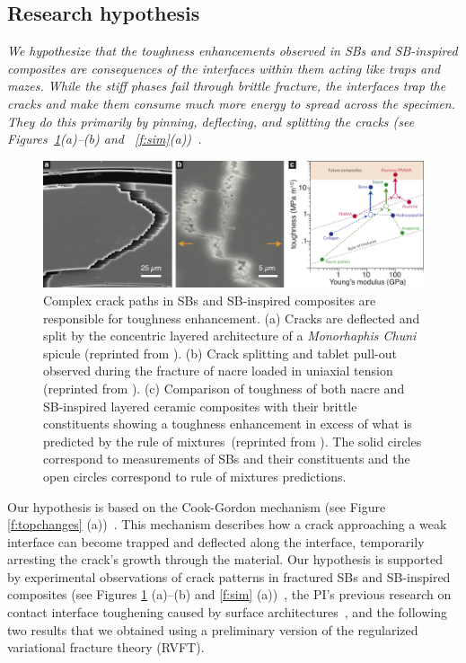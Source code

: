 \documentclass[10pt,letterpaper]{article}
\begin{document}
  \subsection{Research hypothesis}
    \label{s:hyp}
    \emph{We hypothesize that the toughness enhancements observed in SBs and SB-inspired composites are consequences of the interfaces within them acting like traps and mazes. While the stiff phases fail through brittle fracture, the interfaces trap the cracks and make them consume much more energy to spread across the specimen. They do this primarily by pinning, deflecting, and splitting the cracks (see Figures~\ref{f:hyp}(a)--(b) and ~\ref{f:sim}(a))~\cite{gao1989first,dalmas2009crack,gu1997crack}.}
%
    \begin{figure}[h!]
         \centering
           \includegraphics[width=\textwidth, trim={0 0.0cm 0.0cm 0}, clip]{Figures/Introduction/CrackPath_V2.pdf}
           \caption{ \footnotesize Complex crack paths in SBs and SB-inspired composites are responsible for toughness enhancement. (a) Cracks are deflected and split by the concentric layered architecture of a \textit{Monorhaphis Chuni} spicule (reprinted from \cite{Weaver:2010ew}). (b) Crack splitting and tablet pull-out observed during the fracture of nacre loaded in uniaxial tension (reprinted from \cite{wegst2015bioinspired}). (c) Comparison of toughness of both nacre and SB-inspired layered ceramic composites with their brittle constituents showing a toughness enhancement in excess of what is predicted by the rule of mixtures~(reprinted from \cite{wegst2015bioinspired}). The solid circles correspond to measurements of SBs and their constituents and the open circles correspond to rule of mixtures predictions.
             }
           \label{f:hyp}
    \end{figure}
%
    Our hypothesis is based on the Cook-Gordon mechanism (see Figure \ref{f:topchanges} (a))~\cite{cook1964mechanism}. This mechanism describes how a crack approaching a weak interface can become trapped and deflected along the interface, temporarily arresting the crack's growth through the material. Our hypothesis is supported by experimental observations of crack patterns in fractured SBs and SB-inspired composites (see Figures \ref{f:hyp} (a)--(b) and \ref{f:sim} (a))~\cite{barthelat2007experimental,poissant2010novel}, the PI's previous research on contact interface toughening caused by surface architectures~\cite{kesari2010role,kesari2011mechanics,kesari2011effective}, and the following two results that we obtained using a preliminary version of the regularized variational fracture theory (RVFT).
\end{document}
